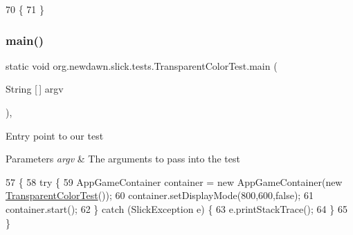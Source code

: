 \begin{DoxyCode}
70                                             \{
71     \}
\end{DoxyCode}
\mbox{\label{classorg_1_1newdawn_1_1slick_1_1tests_1_1_transparent_color_test_a7283800feb1ab083044f7a9829b95eeb}} 
\subsubsection{\texorpdfstring{main()}{main()}}
{\footnotesize\ttfamily static void org.\+newdawn.\+slick.\+tests.\+Transparent\+Color\+Test.\+main (\begin{DoxyParamCaption}\item[{String \mbox{[}$\,$\mbox{]}}]{argv }\end{DoxyParamCaption})\hspace{0.3cm}{\ttfamily [inline]}, {\ttfamily [static]}}

Entry point to our test


\begin{DoxyParams}{Parameters}
{\em argv} & The arguments to pass into the test \\
\hline
\end{DoxyParams}

\begin{DoxyCode}
57                                            \{
58         \textcolor{keywordflow}{try} \{
59             AppGameContainer container = \textcolor{keyword}{new} AppGameContainer(\textcolor{keyword}{new} 
      \mbox{\hyperlink{classorg_1_1newdawn_1_1slick_1_1tests_1_1_transparent_color_test_a88d3d3735b2f55daa13b5be1fd29c125}{TransparentColorTest}}());
60             container.setDisplayMode(800,600,\textcolor{keyword}{false});
61             container.start();
62         \} \textcolor{keywordflow}{catch} (SlickException e) \{
63             e.printStackTrace();
64         \}
65     \}
\end{DoxyCode}
\mbox{\label{classorg_1_1newdawn_1_1slick_1_1tests_1_1_transparent_color_test_a57d3cf6863b720b004dff812d8d9b89c}} 
